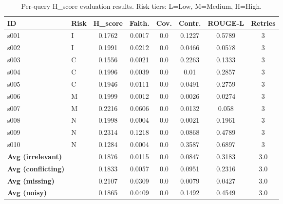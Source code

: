 \begin{table}[h]
\centering
\caption{Per-query H\_score evaluation results. Risk tiers: L=Low, M=Medium, H=High.}
\label{tab:hscore_results}
\begin{tabular}{llcccccc}
\hline
\textbf{ID} & \textbf{Risk} & \textbf{H\_score} & \textbf{Faith.} & \textbf{Cov.} & \textbf{Contr.} & \textbf{ROUGE-L} & \textbf{Retries} \\
\hline
s001 & I & 0.1762 & 0.0017 & 0.0 & 0.1227 & 0.5789 & 3 \\
s002 & I & 0.1991 & 0.0212 & 0.0 & 0.0466 & 0.0578 & 3 \\
s003 & C & 0.1556 & 0.0021 & 0.0 & 0.2263 & 0.1333 & 3 \\
s004 & C & 0.1996 & 0.0039 & 0.0 & 0.01 & 0.2857 & 3 \\
s005 & C & 0.1946 & 0.0111 & 0.0 & 0.0491 & 0.2759 & 3 \\
s006 & M & 0.1999 & 0.0012 & 0.0 & 0.0026 & 0.0274 & 3 \\
s007 & M & 0.2216 & 0.0606 & 0.0 & 0.0132 & 0.058 & 3 \\
s008 & N & 0.1998 & 0.0004 & 0.0 & 0.0021 & 0.1961 & 3 \\
s009 & N & 0.2314 & 0.1218 & 0.0 & 0.0868 & 0.4789 & 3 \\
s010 & N & 0.1284 & 0.0004 & 0.0 & 0.3587 & 0.6897 & 3 \\
\hline
\textbf{Avg (irrelevant)} & & 0.1876 & 0.0115 & 0.0 & 0.0847 & 0.3183 & 3.0 \\
\textbf{Avg (conflicting)} & & 0.1833 & 0.0057 & 0.0 & 0.0951 & 0.2316 & 3.0 \\
\textbf{Avg (missing)} & & 0.2107 & 0.0309 & 0.0 & 0.0079 & 0.0427 & 3.0 \\
\textbf{Avg (noisy)} & & 0.1865 & 0.0409 & 0.0 & 0.1492 & 0.4549 & 3.0 \\
\hline
\end{tabular}
\end{table}